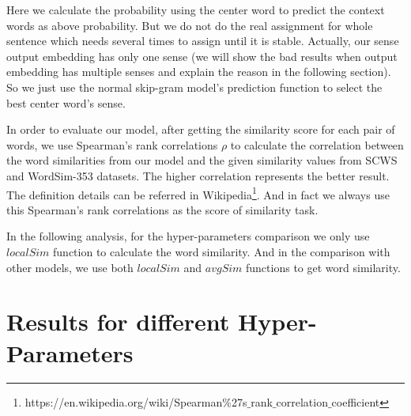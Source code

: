 Here we calculate the probability using the center word to predict the context words as above probability. But we do not do the real assignment for whole sentence which needs several times to assign until it is stable. Actually, our sense output embedding has only one sense (we will show the bad results when output embedding has multiple senses and explain the reason in the following section). So we just use the normal skip-gram model's prediction function to select the best center word's sense.

In order to evaluate our model, after getting the similarity score for each pair of words, we use Spearman’s rank correlations $\rho$ to calculate the correlation between the word similarities from our model and the given similarity values from SCWS and WordSim-353 datasets. The higher correlation represents the better result. The definition details can be referred in Wikipedia\footnote{https://en.wikipedia.org/wiki/Spearman$\%$27s$\_$rank$\_$correlation$\_$coefficient}. 
And in fact we always use this Spearman’s rank correlations as the score of similarity task.

In the following analysis, for the hyper-parameters comparison we only use $localSim$ function to calculate  the word similarity. And in the comparison with other models, we use both $localSim$ and $avgSim$ functions to get word similarity.

\section{Results for different Hyper-Parameters}


